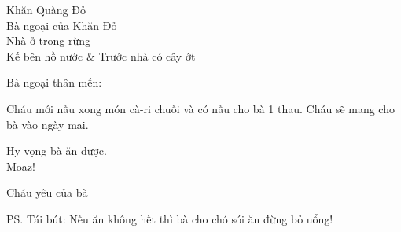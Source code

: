 \documentclass{letter} %
\begin{document}
\begin{letter}{ Khăn Quàng Đỏ\\Bà ngoại của Khăn Đỏ\\ Nhà ở trong rừng\\Kế bên hồ  nước \& Trước nhà có cây ớt} %

\opening{Bà ngoại thân mến:}

		Cháu		mới     nấu 
xong 
món
cà-ri chuối 
	và có nấu cho bà 1 thau. 
Cháu sẽ mang 			cho bà 	vào ngày mai. 

Hy vọng bà ăn được.\\[0.7cm] %
Moaz!

\closing{Cháu yêu của bà} %

\ps{Tái bút: Nếu ăn không hết thì bà cho chó sói ăn đừng bỏ uổng!}

\end{letter}

\end{document}
